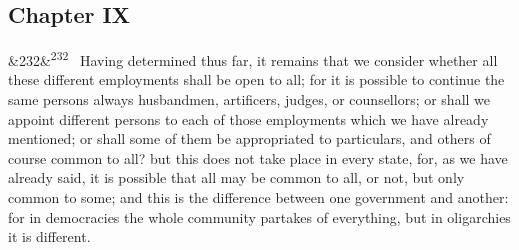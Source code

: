 \documentclass[12pt]{article}
\newcommand{\para}[1][]{\par\noindent\ifx&#1&\else\textsuperscript{\footnotesize #1}~\fi}
\begin{document}
\subsection*{Chapter IX}

\para[232] Having determined thus far, it remains that we consider whether all these different employments shall be open to all; for it is possible to continue the same persons always husbandmen, artificers, judges, or counsellors; or shall we appoint different persons to each of those employments which we have already mentioned; or shall some of them be appropriated to particulars, and others of course common to all? but this does not take place in every state, for, as we have already said, it is possible that all may be common to all, or not, but only common to some; and this is the difference between one government and another: for in democracies the whole community partakes of everything, but in oligarchies it is different.
\end{document}
